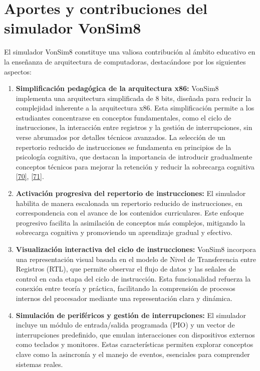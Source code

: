 \documentclass[12pt,oneside]{templates/unerthesis}
\begin{document}
\hypertarget{aportes-y-contribuciones-del-simulador-vonsim8}{%
\section{Aportes y contribuciones del simulador VonSim8}\label{aportes-y-contribuciones-del-simulador-vonsim8}}

El simulador VonSim8 constituye una valiosa contribución al ámbito educativo en la enseñanza de arquitectura de computadoras, destacándose por los siguientes aspectos:

\begin{enumerate}
\def\labelenumi{\arabic{enumi}.}
\item
  \textbf{Simplificación pedagógica de la arquitectura x86:}
  VonSim8 implementa una arquitectura simplificada de 8 bits, diseñada para reducir la complejidad inherente a la arquitectura x86. Esta simplificación permite a los estudiantes concentrarse en conceptos fundamentales, como el ciclo de instrucciones, la interacción entre registros y la gestión de interrupciones, sin verse abrumados por detalles técnicos avanzados. La selección de un repertorio reducido de instrucciones se fundamenta en principios de la psicología cognitiva, que destacan la importancia de introducir gradualmente conceptos técnicos para mejorar la retención y reducir la sobrecarga cognitiva \protect\hyperlink{ref-nationalacademies2018how}{{[}70{]}}, \protect\hyperlink{ref-sweller2010cognitive}{{[}71{]}}.
\item
  \textbf{Activación progresiva del repertorio de instrucciones:}
  El simulador habilita de manera escalonada un repertorio reducido de instrucciones, en correspondencia con el avance de los contenidos curriculares. Este enfoque progresivo facilita la asimilación de conceptos más complejos, mitigando la sobrecarga cognitiva y promoviendo un aprendizaje gradual y efectivo.
\item
  \textbf{Visualización interactiva del ciclo de instrucciones:}
  VonSim8 incorpora una representación visual basada en el modelo de Nivel de Transferencia entre Registros (RTL), que permite observar el flujo de datos y las señales de control en cada etapa del ciclo de instrucción. Esta funcionalidad refuerza la conexión entre teoría y práctica, facilitando la comprensión de procesos internos del procesador mediante una representación clara y dinámica.
\item
  \textbf{Simulación de periféricos y gestión de interrupciones:}
  El simulador incluye un módulo de entrada/salida programada (PIO) y un vector de interrupciones predefinido, que emulan interacciones con dispositivos externos como teclados y monitores. Estas características permiten explorar conceptos clave como la asincronía y el manejo de eventos, esenciales para comprender sistemas reales.

\end{enumerate}
\end{document}

